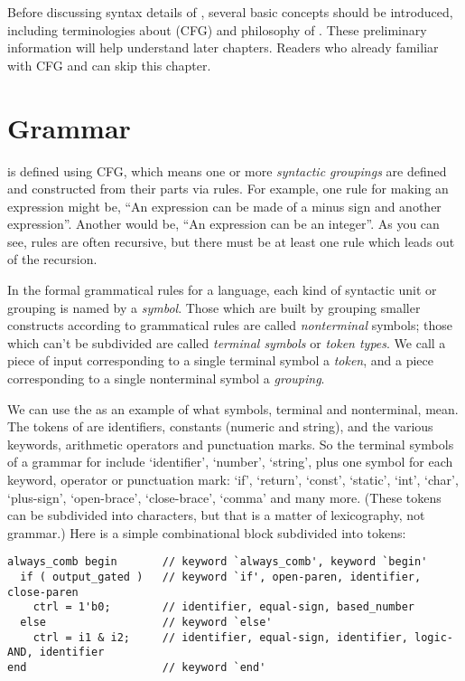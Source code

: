 Before discussing syntax details of \mhdl{}, several basic concepts
should be introduced, including terminologies about \cfg{} (CFG) and
philosophy of \mhdl{}. These preliminary information will help
understand later chapters. Readers who already familiar with CFG
and \vperl{} can skip this chapter.

\section{Grammar}
\mhdl{} is defined using CFG, which means one or more \emph{syntactic groupings} 
are defined and constructed from their parts via rules.  For example,
one rule for making an expression might be, ``An expression can be
made of a minus sign and another expression''. Another would be, ``An
expression can be an integer''.  As you can see, rules are often
recursive, but there must be at least one rule which leads out of the
recursion.

In the formal grammatical rules for a language, each kind of syntactic
unit or grouping is named by a \emph{symbol}. Those which are built by
grouping smaller constructs according to grammatical rules are
called \emph{nonterminal} symbols; those which can't be subdivided are
called \emph{terminal symbols} or
\emph{token types}. We call a piece of input corresponding to a single terminal
symbol a \emph{token}, and a piece corresponding to a single
nonterminal symbol a \emph{grouping}.

We can use the \vlog{} as an example of what symbols, terminal and
nonterminal, mean. The tokens of \vlog{} are identifiers, constants
(numeric and string), and the various keywords, arithmetic operators
and punctuation marks. So the terminal symbols of a grammar
for \vlog{} include `identifier', `number', `string', plus one symbol
for each keyword, operator or punctuation mark: `if', `return',
`const', `static', `int', `char', `plus-sign', `open-brace',
`close-brace', `comma' and many more. (These tokens can be subdivided
into characters, but that is a matter of lexicography, not grammar.)
Here is a simple \vlog{} combinational block subdivided into tokens:
\begin{lstlisting}[caption={\vlog{} example for describing CFG}]
always_comb begin       // keyword `always_comb', keyword `begin'
  if ( output_gated )   // keyword `if', open-paren, identifier, close-paren
    ctrl = 1'b0;        // identifier, equal-sign, based_number
  else                  // keyword `else'
    ctrl = i1 & i2;     // identifier, equal-sign, identifier, logic-AND, identifier
end                     // keyword `end'
\end{lstlisting}

